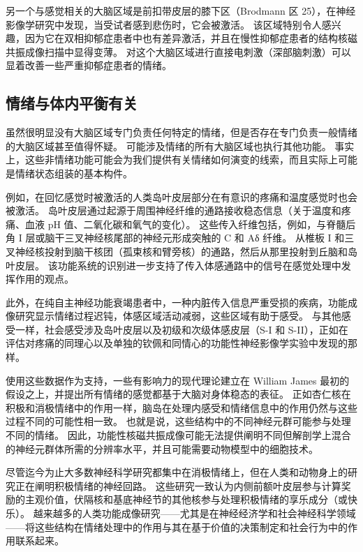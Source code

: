 另一个与感觉相关的大脑区域是前扣带皮层的膝下区（Brodmann 区 25），在神经影像学研究中发现，当受试者感到悲伤时，它会被激活。
该区域特别令人感兴趣，因为它在双相抑郁症患者中也有差异激活，并且在慢性抑郁症患者的结构核磁共振成像扫描中显得变薄。
对这个大脑区域进行直接电刺激（深部脑刺激）可以显着改善一些严重抑郁症患者的情绪。



\subsection{情绪与体内平衡有关}

虽然很明显没有大脑区域专门负责任何特定的情绪，但是否存在专门负责一般情绪的大脑区域甚至值得怀疑。
可能涉及情绪的所有大脑区域也执行其他功能。
事实上，这些非情绪功能可能会为我们提供有关情绪如何演变的线索，而且实际上可能是情绪状态组装的基本构件。


例如，在回忆感觉时被激活的人类岛叶皮层部分在有意识的疼痛和温度感觉时也会被激活。
岛叶皮层通过起源于周围神经纤维的通路接收稳态信息（关于温度和疼痛、血液 pH 值、二氧化碳和氧气的变化）。
这些传入纤维包括，例如，与脊髓后角 I 层或脑干三叉神经核尾部的神经元形成突触的 C 和 Aδ 纤维。
从椎板 I 和三叉神经核投射到脑干核团（孤束核和臂旁核）的通路，然后从那里投射到丘脑和岛叶皮层。
该功能系统的识别进一步支持了传入体感通路中的信号在感觉处理中发挥作用的观点。


此外，在纯自主神经功能衰竭患者中，一种内脏传入信息严重受损的疾病，功能成像研究显示情绪过程迟钝，体感区域活动减弱，这些区域有助于感受。
与其他感受一样，社会感受涉及岛叶皮层以及初级和次级体感皮层（S-I 和 S-II），正如在评估对疼痛的同理心以及单独的钦佩和同情心的功能性神经影像学实验中发现的那样。


使用这些数据作为支持，一些有影响力的现代理论建立在 William James 最初的假设之上，并提出所有情绪的感觉都基于大脑对身体稳态的表征。
正如杏仁核在积极和消极情绪中的作用一样，脑岛在处理内感受和情绪信息中的作用仍然与这些过程不同的可能性相一致。
也就是说，这些结构中的不同神经元群可能参与处理不同的情绪。
因此，功能性核磁共振成像可能无法提供阐明不同但解剖学上混合的神经元群体所需的分辨率水平，并且可能需要动物模型中的细胞技术。


尽管迄今为止大多数神经科学研究都集中在消极情绪上，但在人类和动物身上的研究正在阐明积极情绪的神经回路。
这些研究一致认为内侧前额叶皮层参与计算奖励的主观价值，伏隔核和基底神经节的其他核参与处理积极情绪的享乐成分（或快乐）。
越来越多的人类功能成像研究——尤其是在神经经济学和社会神经科学领域——将这些结构在情绪处理中的作用与其在基于价值的决策制定和社会行为中的作用联系起来。



